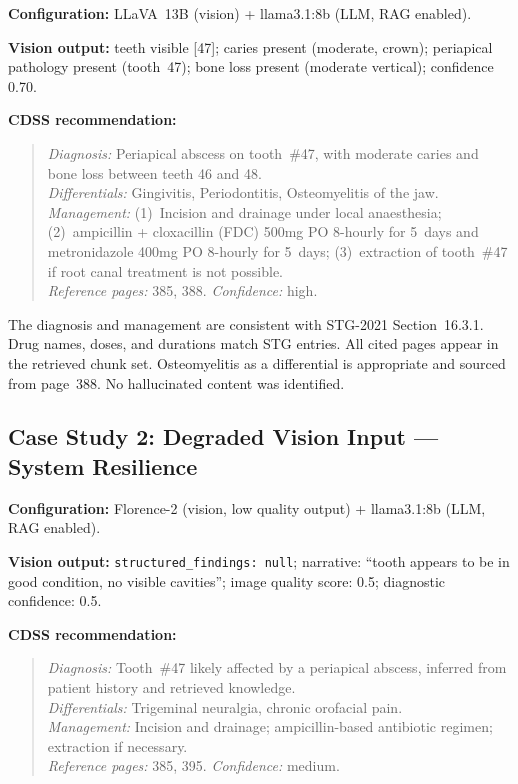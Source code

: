 \documentclass[12pt,a4paper]{report}
\begin{document}
	\textbf{Configuration:} LLaVA~13B (vision) + llama3.1:8b (LLM, RAG enabled).
	
	\textbf{Vision output:} teeth visible [47]; caries present (moderate, crown);
	periapical pathology present (tooth~47); bone loss present (moderate vertical);
	confidence 0.70.
	
	\textbf{CDSS recommendation:}
	\begin{quote}
		\textit{Diagnosis:} Periapical abscess on tooth~\#47, with moderate caries and
		bone loss between teeth 46 and 48. \\
		\textit{Differentials:} Gingivitis, Periodontitis, Osteomyelitis of the jaw. \\
		\textit{Management:} (1)~Incision and drainage under local anaesthesia;
		(2)~ampicillin + cloxacillin (FDC) 500mg PO 8-hourly for 5~days and
		metronidazole 400mg PO 8-hourly for 5~days;
		(3)~extraction of tooth~\#47 if root canal treatment is not possible. \\
		\textit{Reference pages:} 385, 388. \textit{Confidence:} high.
	\end{quote}
	
	The diagnosis and management are consistent with STG-2021 Section~16.3.1.
	Drug names, doses, and durations match STG entries. All cited pages appear in
	the retrieved chunk set. Osteomyelitis as a differential is appropriate and
	sourced from page~388. No hallucinated content was identified.
	
	\subsection{Case Study 2: Degraded Vision Input --- System Resilience}
	\label{subsec:case2}
	
	\textbf{Configuration:} Florence-2 (vision, low quality output) + llama3.1:8b (LLM, RAG enabled).
	
	\textbf{Vision output:} \texttt{structured\_findings: null}; narrative: ``tooth
	appears to be in good condition, no visible cavities''; image quality score:
	0.5; diagnostic confidence: 0.5.
	
	\textbf{CDSS recommendation:}
	\begin{quote}
		\textit{Diagnosis:} Tooth~\#47 likely affected by a periapical abscess,
		inferred from patient history and retrieved knowledge. \\
		\textit{Differentials:} Trigeminal neuralgia, chronic orofacial pain. \\
		\textit{Management:} Incision and drainage; ampicillin-based antibiotic
		regimen; extraction if necessary. \\
		\textit{Reference pages:} 385, 395. \textit{Confidence:} medium.
	\end{quote}
	
\end{document}
